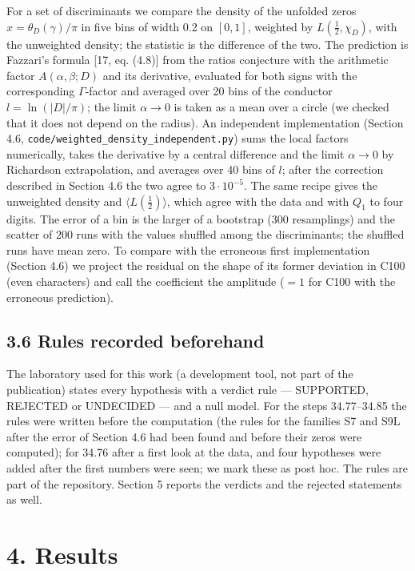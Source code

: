\documentclass[
  10pt,
]{article}
\begin{document}
For a set of discriminants we compare the density of the unfolded zeros
\(x = \theta_D(\gamma)/\pi\) in five bins of width 0.2 on \([0, 1]\),
weighted by \(L(\tfrac12, \chi_D)\), with the unweighted density; the
statistic is the difference of the two. The prediction is Fazzari's
formula {[}17, eq. (4.8){]} from the ratios conjecture with the
arithmetic factor \(A(\alpha, \beta; D)\) and its derivative, evaluated
for both signs with the corresponding \(\Gamma\)-factor and averaged
over 20 bins of the conductor \(l = \ln(|D|/\pi)\); the limit
\(\alpha \to 0\) is taken as a mean over a circle (we checked that it
does not depend on the radius). An independent implementation (Section
4.6, \texttt{code/weighted\_density\_independent.py}) sums the local
factors numerically, takes the derivative by a central difference and
the limit \(\alpha \to 0\) by Richardson extrapolation, and averages
over 40 bins of \(l\); after the correction described in Section 4.6 the
two agree to \(3\cdot10^{-5}\). The same recipe gives the unweighted
density and \(\langle L(\tfrac12)\rangle\), which agree with the data
and with \(Q_1\) to four digits. The error of a bin is the larger of a
bootstrap (300 resamplings) and the scatter of 200 runs with the values
shuffled among the discriminants; the shuffled runs have mean zero. To
compare with the erroneous first implementation (Section 4.6) we project
the residual on the shape of its former deviation in C100 (even
characters) and call the coefficient the amplitude (\(= 1\) for C100
with the erroneous prediction).

\hypertarget{rules-recorded-beforehand}{%
\subsection{3.6 Rules recorded
beforehand}\label{rules-recorded-beforehand}}

The laboratory used for this work (a development tool, not part of the
publication) states every hypothesis with a verdict rule --- SUPPORTED,
REJECTED or UNDECIDED --- and a null model. For the steps 34.77--34.85
the rules were written before the computation (the rules for the
families S7 and S9L after the error of Section 4.6 had been found and
before their zeros were computed); for 34.76 after a first look at the
data, and four hypotheses were added after the first numbers were seen;
we mark these as post hoc. The rules are part of the repository. Section
5 reports the verdicts and the rejected statements as well.

\hypertarget{results}{%
\section{4. Results}\label{results}}
\end{document}
